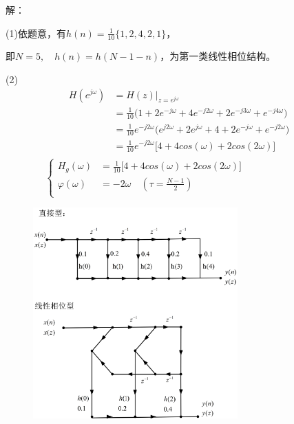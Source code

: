 \documentclass[notheorems,compress,mathserif,table]{beamer}
\begin{document}
\begin{frame}[allowframebreaks]\frametitle{}%
\par 解：\par
     \par (1)依题意，有$h(n)= \frac{1}{10}\{1,2,4,2,1\}$，
     \par 即$N=5,\quad h(n)=h(N-1-n)$，为第一类线性相位结构。
     \par (2)
     \begin{equation*}
            \begin{split}
            H(e^{j\omega})
              &= H(z)|_{z=e^{j\omega}}\\
              &= \frac{1}{10}
                 \Big(1+2e^{-j\omega}+4e^{-j2\omega}+2e^{-j3\omega}+e^{-j4\omega}\Big)\\
              &= \frac{1}{10}e^{-j2\omega}
                 \Big(e^{j2\omega}+2e^{j\omega}+4+2e^{-j\omega}+e^{-j2\omega}\Big)\\
              &= \frac{1}{10}e^{-j2\omega}\Big[4+4cos(\omega)+2cos(2\omega)\Big]\\
            \end{split}
     \end{equation*}
     $$
            \left\{ \begin{aligned}
              H_g(\omega)
                    &=\frac{1}{10}\big[4+4cos(\omega)+2cos(2\omega)\big]\qquad\qquad\qquad\quad\\
              \varphi(\omega)
                    &=-2\omega\quad(\tau = \frac{N-1}{2})\\
            \end{aligned} \right.
     $$
     \begin{figure}[h]
          \centering
          \includegraphics[width=0.7\textwidth]{example1.jpg}
      \end{figure}


\end{frame}
\end{document}
